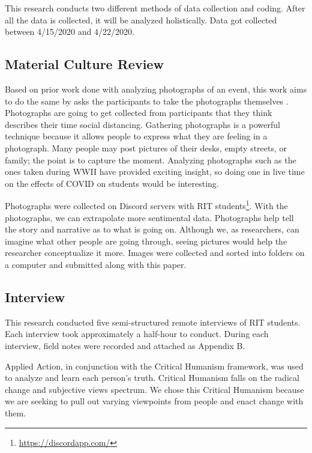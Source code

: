 \documentclass[12pt,
 reprint,
nofootinbib,
 amsmath,amssymb,
 aps,
floatfix,
]{revtex4-2}
\begin{document}
This research conducts two different methods of data collection and coding. After all the data is collected, it will be analyzed holistically. Data got collected between 4/15/2020 and 4/22/2020. 

\subsection{Material Culture Review}

Based on prior work done with analyzing photographs of an event, this work aims to do the same by asks the participants to take the photographs themselves \cite{photographyMaterialCulture, generalDocumentAnalysis}. 
Photographs are going to get collected from participants that they think describes their time social distancing. Gathering photographs is a powerful technique because it allows people to express what they are feeling in a photograph. Many people may post pictures of their desks, empty streets, or family; the point is to capture the moment.
Analyzing photographs such as the ones taken during WWII\cite{wwII} have provided exciting insight, so doing one in live time on the effects of COVID on students would be interesting. 

Photographs were collected on Discord servers with RIT students\footnote{\url{https://discordapp.com/}}. With the photographs, we can extrapolate more sentimental data. Photographs help tell the story and narrative as to what is going on. Although we, as researchers, can imagine what other people are going through, seeing pictures would help the researcher conceptualize it more. Images were collected and sorted into folders on a computer and submitted along with this paper. 

\subsection{Interview}

This research conducted five semi-structured remote interviews of RIT students.
Each interview took approximately a half-hour to conduct. During each interview, field notes were recorded and attached as Appendix B. 

Applied Action, in conjunction with the Critical Humanism framework, was used to analyze and learn each person's truth. 
Critical Humanism falls on the radical change and subjective views spectrum. 
We chose this Critical Humanism because we are seeking to pull out varying viewpoints from people and enact change with them.
\end{document}
